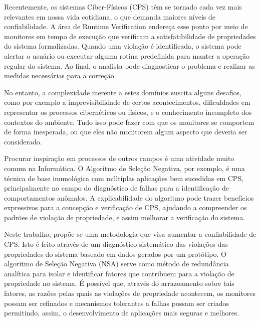 Recentemente, os sistemas Ciber-Físicos (CPS) têm se tornado cada vez mais relevantes em nossa vida cotidiana, o que demanda maiores níveis de confiabilidade. A área de Runtime Verification endereça esse ponto por meio de monitores em tempo de execução que verificam a satisfatibilidade de propriedades do sistema formalizadas. Quando uma violação é identificada, o sistema pode alertar o usuário ou executar alguma rotina predefinida para manter a operação regular do sistema. Ao final, o analista pode diagnosticar o problema e realizar as medidas necessárias para a correção

No entanto, a complexidade inerente a estes domínios suscita alguns desafios, como por exemplo a imprevisibilidade de certos acontecimentos, dificuldades em representar os processos cibernéticos ou físicos, e o conhecimento incompleto dos contextos do ambiente. Tudo isso pode fazer com que os monitores se comportem de forma inesperada, ou que eles não monitorem algum aspecto que deveria ser considerado.

Procurar inspiração em processos de outros campos é uma atividade muito comum na Informática. O Algoritmo de Seleção Negativa, por exemplo, é uma técnica de base imunológica com múltiplas aplicações bem sucedidas em CPS, principalmente no campo do diagnóstico de falhas para a identificação de comportamentos anômalos. A explicabilidade do algoritmo pode trazer benefícios expressivos para a concepção e verificação de CPS, ajudando a compreender os padrões de violação de propriedade, e assim melhorar a verificação do sistema.

Neste trabalho, propõe-se uma metodologia que visa aumentar a confiabilidade de CPS. Isto é feito através de um diagnóstico sistemático das violações das propriedades do sistema baseado em dados gerados por um protótipo. O algoritmo de Seleção Negativa (NSA) serve como método de redundância analítica para isolar e identificar fatores que contribuem para a violação de propriedade no sistema. É possível que, através do arrazoamento sobre tais fatores, 
as razões pelas quais as violações de propriedade acontecem, os monitores possam ser refinados e mecanismos tolerantes a falhas possam ser criados permitindo, assim, o desenvolvimento de aplicações mais seguras e melhores.